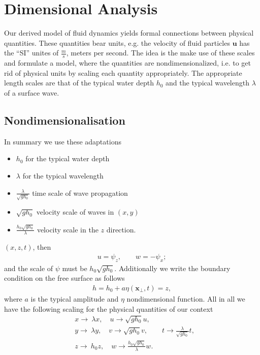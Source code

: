 \section{Dimensional Analysis}
Our derived model of fluid dynamics yields formal connections between
physical quantities. These quantities bear units, e.g. the velocity of fluid
particles $\mathbf{u}$ has the ``SI'' unites of $\frac{m}{s}$, meters per
second. The idea is the make use of these scales and formulate a model, where
the quantities are nondimensionalized, i.e. to get rid of physical units by
scaling each quantity appropriately. The appropriate length scales are that
of the typical water depth $h_0$ and the typical wavelength $\lambda$ of a
surface wave.

\subsection{Nondimensionalisation\label{sec:nondim}}
In summary we use these adaptations
\begin{itemize}
    \item $h_0$ for the typical water depth
    \item $\lambda$ for the typical wavelength
    \item $\frac{\lambda}{\sqrt{g h_0}}$ time scale of wave propagation
    \item $\sqrt{g h_0}$ velocity scale of waves in $(x, y)$
    \item $\frac{h_0 \sqrt{g h_0} }{\lambda}$ velocity scale in the $z$
        direction.
\end{itemize}
$(x, z, t)$, then
\begin{align}
    u = \psi _z, \qquad w = - \psi_x;
\end{align}
and the scale of $\psi$ must be $h_0\sqrt{g h_0}$. Additionally we write the
boundary condition on the free surface as follows
\begin{align}
    h  = h_0 + a \eta (\mathbf{x}_\perp, t) = z,
\end{align}
where $a$ is the typical amplitude and $\eta$ nondimensional function. All in
all we have the following scaling for the physical quantities of our context
\begin{align}
    &x \rightarrow\ \lambda x, \quad u \rightarrow \sqrt{gh_0} u, \\
      &y \rightarrow\ \lambda y, \quad v \rightarrow \sqrt{gh_0} v, \qquad
      t\rightarrow \frac{\lambda}{\sqrt{gh_0}}t,\\
      &z \rightarrow\ h_0 z, \quad w \rightarrow
    \frac{h_0\sqrt{gh_0}}{\lambda} w.
\end{align}

